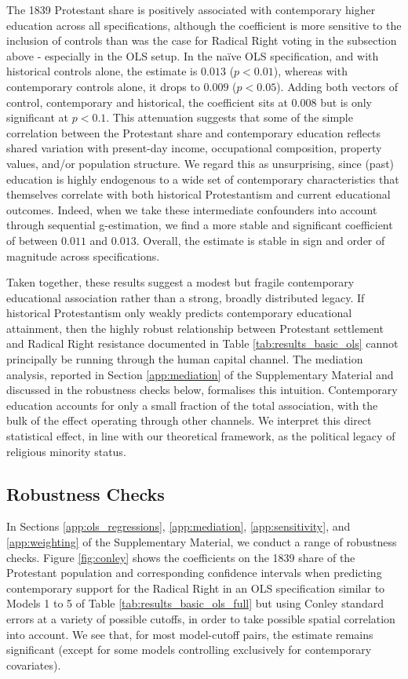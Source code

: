 \documentclass[12pt]{article}
\begin{document}
The 1839 Protestant share is positively associated with contemporary higher education across all specifications, although the coefficient is more sensitive to the inclusion of controls than was the case for Radical Right voting in the subsection above - especially in the OLS setup. In the naïve OLS specification, and with historical controls alone, the estimate is $0.013$ ($p < 0.01$), whereas with contemporary controls alone, it drops to $0.009$ ($p < 0.05$). Adding both vectors of control, contemporary and historical, the coefficient sits at $0.008$ but is only significant at $p < 0.1$. This attenuation suggests that some of the simple correlation between the Protestant share and contemporary education reflects shared variation with present-day income, occupational composition, property values, and/or population structure. We regard this as unsurprising, since (past) education is highly endogenous to a wide set of contemporary characteristics that themselves correlate with both historical Protestantism and current educational outcomes. Indeed, when we take these intermediate confounders into account through sequential g-estimation, we find a more stable and significant coefficient of between $0.011$ and $0.013$. Overall, the estimate is stable in sign and order of magnitude across specifications. 

Taken together, these results suggest a modest but fragile contemporary educational association rather than a strong, broadly distributed legacy. If historical Protestantism only weakly predicts contemporary educational attainment, then the highly robust relationship between Protestant settlement and Radical Right resistance documented in Table \ref{tab:results_basic_ols} cannot principally be running through the human capital channel. The mediation analysis, reported in Section \ref{app:mediation} of the Supplementary Material and discussed in the robustness checks below, formalises this intuition. Contemporary education accounts for only a small fraction of the total association, with the bulk of the effect operating through other channels. We interpret this direct statistical effect, in line with our theoretical framework, as the political legacy of religious minority status.




\subsection{Robustness Checks}
In Sections \ref{app:ols_regressions}, \ref{app:mediation}, \ref{app:sensitivity}, and \ref{app:weighting} of the Supplementary Material, we conduct a range of robustness checks. Figure \ref{fig:conley} shows the coefficients on the 1839 share of the Protestant population and corresponding confidence intervals when predicting contemporary support for the Radical Right in an OLS specification similar to Models 1 to 5 of Table \ref{tab:results_basic_ols_full} but using Conley standard errors at a variety of possible cutoffs, in order to take possible spatial correlation into account. We see that, for most model-cutoff pairs, the estimate remains significant (except for some models controlling exclusively for contemporary covariates).
\end{document}
